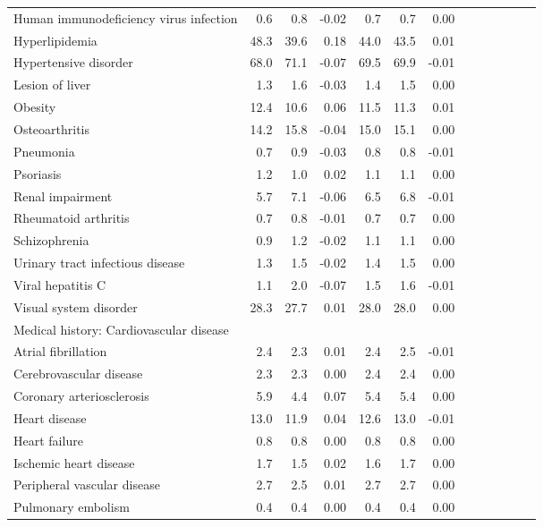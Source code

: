 \documentclass[11pt,]{article}
\begin{document}
\begin{longtable}{lrrrrrrrrrrrr}
      Human immunodeficiency virus infection &  0.6 &  0.8 & -0.02 &  0.7 &  0.7 &  0.00 \\ 
      Hyperlipidemia & 48.3 & 39.6 &  0.18 & 44.0 & 43.5 &  0.01 \\ 
      Hypertensive disorder & 68.0 & 71.1 & -0.07 & 69.5 & 69.9 & -0.01 \\ 
      Lesion of liver &  1.3 &  1.6 & -0.03 &  1.4 &  1.5 &  0.00 \\ 
      Obesity & 12.4 & 10.6 &  0.06 & 11.5 & 11.3 &  0.01 \\ 
      Osteoarthritis & 14.2 & 15.8 & -0.04 & 15.0 & 15.1 &  0.00 \\ 
      Pneumonia &  0.7 &  0.9 & -0.03 &  0.8 &  0.8 & -0.01 \\ 
      Psoriasis &  1.2 &  1.0 &  0.02 &  1.1 &  1.1 &  0.00 \\ 
      Renal impairment &  5.7 &  7.1 & -0.06 &  6.5 &  6.8 & -0.01 \\ 
      Rheumatoid arthritis &  0.7 &  0.8 & -0.01 &  0.7 &  0.7 &  0.00 \\ 
      Schizophrenia &  0.9 &  1.2 & -0.02 &  1.1 &  1.1 &  0.00 \\ 
      Urinary tract infectious disease &  1.3 &  1.5 & -0.02 &  1.4 &  1.5 &  0.00 \\ 
      Viral hepatitis C &  1.1 &  2.0 & -0.07 &  1.5 &  1.6 & -0.01 \\ 
      Visual system disorder & 28.3 & 27.7 &  0.01 & 28.0 & 28.0 &  0.00 \\ 
  Medical history: Cardiovascular disease &    &    &     &    &    &     \\ 
      Atrial fibrillation &  2.4 &  2.3 &  0.01 &  2.4 &  2.5 & -0.01 \\ 
      Cerebrovascular disease &  2.3 &  2.3 &  0.00 &  2.4 &  2.4 &  0.00 \\ 
      Coronary arteriosclerosis &  5.9 &  4.4 &  0.07 &  5.4 &  5.4 &  0.00 \\ 
      Heart disease & 13.0 & 11.9 &  0.04 & 12.6 & 13.0 & -0.01 \\ 
      Heart failure &  0.8 &  0.8 &  0.00 &  0.8 &  0.8 &  0.00 \\ 
      Ischemic heart disease &  1.7 &  1.5 &  0.02 &  1.6 &  1.7 &  0.00 \\ 
      Peripheral vascular disease &  2.7 &  2.5 &  0.01 &  2.7 &  2.7 &  0.00 \\ 
      Pulmonary embolism &  0.4 &  0.4 &  0.00 &  0.4 &  0.4 &  0.00 \\ 

\end{longtable}
\end{document}
